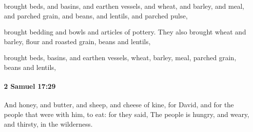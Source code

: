 			\begin{versebox}
					\item[BHS] 
					\item[ASV] brought beds, and basins, and earthen vessels, and wheat, and barley, and meal, and parched grain, and beans, and lentils, and parched pulse,
					\item[NIV] brought bedding and bowls and articles of pottery. They also brought wheat and barley, flour and roasted grain, beans and lentils,
					\item[NRSV] brought beds, basins, and earthen vessels, wheat, barley, meal, parched grain, beans and lentils,
			\end{versebox}

		\paragraph{2 Samuel 17:29} %
			\label{2SAMUEL-17-29}

			And honey, and butter, and sheep, and cheese of kine, for David, and for the people that were with him, to eat: for they said, The people is hungry, and weary, and thirsty, in the wilderness.

